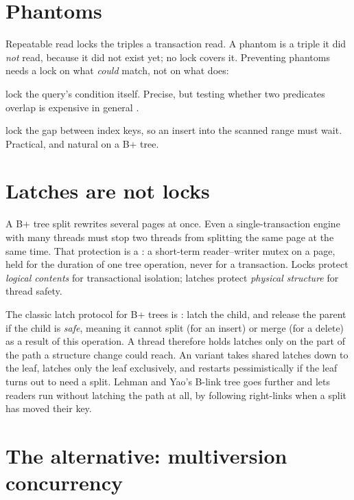 \section{Phantoms}

Repeatable read locks the triples a transaction read. A phantom is a triple it
did \emph{not} read, because it did not exist yet; no lock covers it. Preventing
phantoms needs a lock on what \emph{could} match, not on what does:

\begin{description}[leftmargin=1.2em]
\item[Predicate locks] lock the query's condition itself. Precise, but testing whether two predicates overlap is expensive in general \cite{eswaran}.
\item[Key-range (next-key) locks] lock the gap between index keys, so an insert into the scanned range must wait. Practical, and natural on a B+ tree.
\end{description}

\section{Latches are not locks}

A B+ tree split rewrites several pages at once. Even a single-transaction
engine with many threads must stop two threads from splitting the same page at
the same time. That protection is a : a short-term reader--writer
mutex on a page, held for the duration of one tree operation, never for a
transaction. Locks protect \emph{logical contents} for transactional isolation;
latches protect \emph{physical structure} for thread safety.

The classic latch protocol for B+ trees is : latch the child,
and release the parent if the child is \emph{safe}, meaning it cannot split (for
an insert) or merge (for a delete) as a result of this operation. A thread
therefore holds latches only on the part of the path a structure change could
reach. An  variant takes shared latches down to the leaf,
latches only the leaf exclusively, and restarts pessimistically if the leaf
turns out to need a split. Lehman and Yao's B-link tree \cite{lehmanyao} goes
further and lets readers run without latching the path at all, by following
right-links when a split has moved their key.

\section{The alternative: multiversion concurrency}

